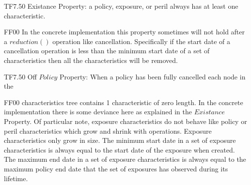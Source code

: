 %
\@pvspace{8.0pt}%
\begin{lcom}{0}%
\begin{cpar}{0}{T}{F}{7.5}{0}{}%
 Existance Property: a policy, exposure, or peril always has at least one
 characteristic.
\end{cpar}%
\begin{cpar}{1}{F}{F}{0}{0}{}%
 In the concrete implementation this property sometimes will not hold after a
 \ensuremath{reduction()
 } operation like cancellation. Specifically if the start date of a
 cancellation operation
 is less than the minimum start date of a set of characteristics then all the
 characteristics
 will be removed.
\end{cpar}%
\end{lcom}%
%
%
%
\@pvspace{8.0pt}%
\begin{lcom}{0}%
\begin{cpar}{0}{T}{F}{7.5}{0}{}%
 Off \ensuremath{Policy} Property: When a policy has been fully cancelled each
 node in the
\end{cpar}%
\begin{cpar}{1}{F}{F}{0}{0}{}%
 characteristics tree contains 1 characteristic of zero length. In the
 concrete implementation
 there is some deviance here as explained in the \ensuremath{Existance}
 Property. Of particular note,
 exposure characteristics do not behave like policy or peril characteristics
 which grow
 and shrink with operations. Exposure characteristics only grow in size. The
 minimum
 start date in a set of exposure characteristics is always equal to the start
 date of the
 exposure when created. The maximum end date in a set of exposure
 characteristics is
 always equal to the maximum policy end date that the set of exposures has
 observed during
 its lifetime.
\end{cpar}%
\end{lcom}%
%
%
%
%
%
